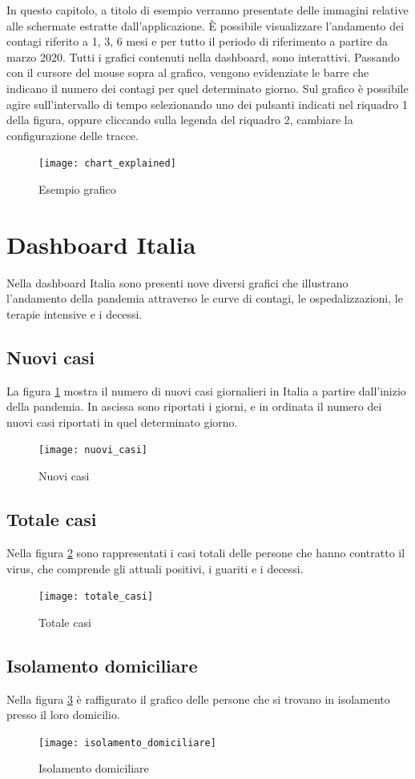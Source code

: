 In questo capitolo, a titolo di esempio verranno presentate delle immagini relative alle schermate estratte dall'applicazione.
È possibile visualizzare l’andamento dei contagi riferito a 1, 3, 6 mesi e per tutto il periodo di riferimento a partire da marzo 2020.
Tutti i grafici contenuti nella dashboard, sono interattivi.
Passando con il cursore del mouse sopra al grafico, vengono evidenziate le barre che indicano il numero dei contagi per quel determinato giorno.
Sul grafico è possibile agire sull'intervallo di tempo selezionando uno dei pulsanti indicati nel riquadro 1 della figura, oppure cliccando sulla legenda del riquadro 2, cambiare la configurazione delle tracce.
\begin{figure}[htp]
    \centering
    \texttt{[image: chart\_explained]}
    \caption{Esempio grafico}
\end{figure}
\section{Dashboard Italia}
Nella dashboard Italia sono presenti nove diversi grafici che illustrano l’andamento della pandemia attraverso le curve di contagi, le ospedalizzazioni, le terapie intensive e i decessi.
\subsection{Nuovi casi}
La figura \ref{fig:nuovi_casi} mostra il numero di nuovi casi giornalieri in Italia a partire dall'inizio della pandemia.
In ascissa sono riportati i giorni, e in ordinata il numero dei nuovi casi riportati in quel determinato giorno.
\begin{figure}[htp]
    \centering
    \texttt{[image: nuovi\_casi]}
    \caption{Nuovi casi}
    \label{fig:nuovi_casi}
\end{figure}

\subsection{Totale casi}
Nella figura \ref{fig:totale_casi} sono rappresentati i casi totali delle persone che hanno contratto il virus, che comprende gli attuali positivi, i guariti e i decessi.
\begin{figure}[htp]
    \centering
    \texttt{[image: totale\_casi]}
    \caption{Totale casi}
    \label{fig:totale_casi}
\end{figure}

\subsection{Isolamento domiciliare}
Nella figura \ref{fig:isolamento_domiciliare} è raffigurato il grafico delle persone che si trovano in isolamento presso il loro domicilio.
\begin{figure}[htp]
    \centering
    \texttt{[image: isolamento\_domiciliare]}
    \caption{Isolamento domiciliare}
    \label{fig:isolamento_domiciliare}
\end{figure}

